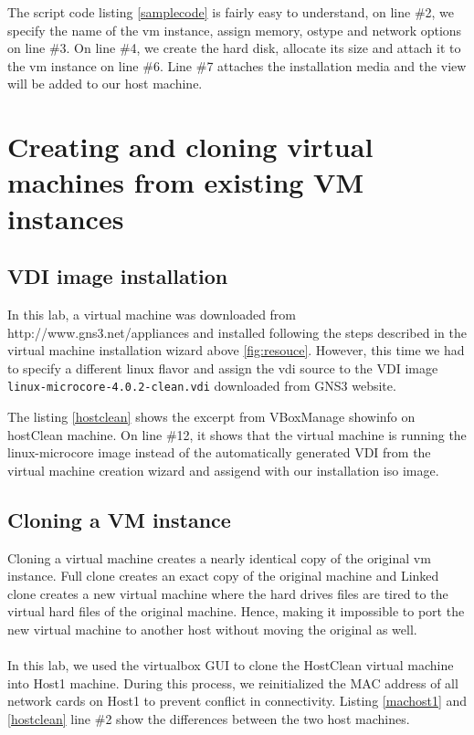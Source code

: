 \documentclass[12pt]{article}
\begin{document}


The script code listing \ref{samplecode} is fairly easy to understand, on line \#2, we specify the name of the vm instance, assign memory, ostype and network options on line \#3. On line \#4, we create the hard disk, allocate its size and  attach it to the vm instance on line \#6. Line \#7 attaches the installation media and the view will be added to our host machine. 

\section{Creating and cloning virtual machines from existing VM instances}
\label{sec:cloning}

\subsection{VDI image installation}

In this lab, a virtual machine was downloaded from http://www.gns3.net/appliances and installed following the steps described in the virtual machine installation wizard above \ref{fig:resouce}. However, this time we had to specify a different linux flavor and assign the vdi source to the VDI image \texttt{linux-microcore-4.0.2-clean.vdi} downloaded from GNS3 website.



The listing \ref{hostclean} shows the excerpt from VBoxManage showinfo on host\textunderscore Clean machine. On line \#12, it shows that the virtual machine is running the linux-microcore image instead of the automatically generated VDI from the virtual machine creation wizard and assigend with our installation iso image.

\subsection{Cloning a VM instance}

Cloning a virtual machine creates a nearly identical copy of the original vm instance. Full clone creates an exact copy of the original machine and Linked clone creates a new virtual machine where the hard drives files are tired to the virtual hard files of the original machine. Hence, making it impossible to port the new virtual machine to another host without moving the original as well.
\\\\
In this lab, we used the virtualbox GUI to clone the Host\textunderscore Clean virtual machine into Host1 machine. During this process, we reinitialized the MAC address of all network cards on Host1 to prevent conflict in connectivity. Listing \ref{machost1} and \ref{hostclean} line \#2 show the differences between the two host machines.
\end{document}
